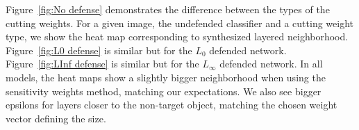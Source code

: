Figure~\ref{fig:No defense} demonstrates the difference between the types of the cutting weights.
  For a given image, the undefended classifier and a cutting weight type, we show the heat map corresponding to synthesized layered neighborhood.
  Figure~\ref{fig:L0 defense} is similar but for the $L_0$ defended network.
  Figure~\ref{fig:LInf defense} is similar but for the $L_{\infty}$ defended network.
  In all models, the heat maps show a slightly bigger neighborhood when using the sensitivity weights method, matching our expectations.
  We also see bigger epsilons for layers closer to the non-target object, matching the chosen weight vector defining the size.